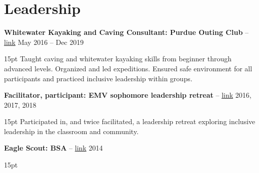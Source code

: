 \documentclass[10pt,letterpaper]{article}
\newcommand{\resumeItem}[4]{
	\begingroup
	\def\link{#2}
	\textbf{#1}
	\ifx\link\empty \else 
		-- \href{#2}{link}
	\fi
	\hfill #3\\
	\begin{adjustwidth}{15pt}{}
	#4
	\end{adjustwidth}
	\endgroup
}
\begin{document}
\section*{Leadership}
\resumeItem
{Whitewater Kayaking and Caving Consultant: Purdue Outing Club}
{}
{May 2016 -- Dec 2019}
{Taught caving and whitewater kayaking skills from beginner through advanced levels. Organized and led expeditions. Ensured safe environment for all participants and practiced inclusive leadership within groups.}

\resumeItem
{Facilitator, participant: EMV sophomore leadership retreat}
{}
{2016, 2017, 2018}
{Participated in, and twice facilitated, a leadership retreat exploring inclusive leadership in the classroom and community.}

\resumeItem
{Eagle Scout: BSA}
{}
{2014}
{}
\end{document}
